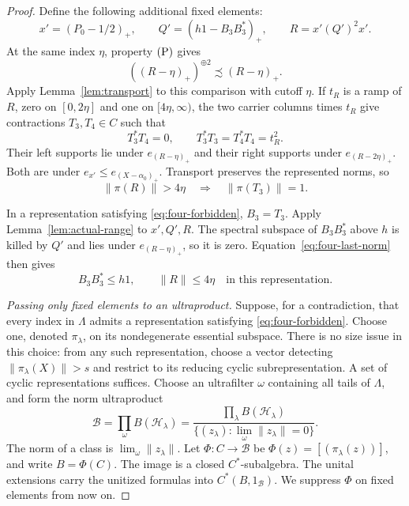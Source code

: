 \begin{proof}
Define the following additional fixed elements:
\begin{equation}\label{eq:four-second-fixed}
 x'=(P_0-1/2)_+,\qquad
 Q'=(h1-B_3B_3^*)_+,\qquad R=x'(Q')^2x'.
\end{equation}
At the same index \(\eta\), property \(\textup{(P)}\) gives
\[
 ((R-\eta)_+)^{\oplus2}\precsim(R-\eta)_+.
\]
Apply Lemma~\ref{lem:transport} to this comparison with cutoff
\(\eta\).  If \(t_R\) is a ramp of \(R\),
zero on \([0,2\eta]\) and one on \([4\eta,\infty)\), the two
carrier columns times \(t_R\) give contractions \(T_3,T_4\in C\)
such that
\begin{equation}\label{eq:four-last-entries}
 T_3^*T_4=0,\qquad T_3^*T_3=T_4^*T_4=t_R^2.
\end{equation}
Their left supports lie under \(e_{(R-\eta)_+}\) and their
right supports under \(e_{(R-2\eta)_+}\).  Both are under
\(e_{x'}\le e_{(X-\alpha_0)_+}\).  Transport preserves the
represented norms, so
\begin{equation}\label{eq:four-last-norm}
 \|\pi(R)\|>4\eta\quad\Longrightarrow\quad
 \|\pi(T_3)\|=1.
\end{equation}

In a representation satisfying \eqref{eq:four-forbidden},
\(B_3=T_3\).  Apply Lemma~\ref{lem:actual-range} to \(x',Q',R\).
The spectral subspace of \(B_3B_3^*\) above \(h\) is killed by
\(Q'\) and lies under \(e_{(R-\eta)_+}\), so it is zero.
Equation~\eqref{eq:four-last-norm} then gives
\begin{equation}\label{eq:four-last-bounds}
 B_3B_3^*\le h1,\qquad \|R\|\le4\eta
 \quad\text{in this representation}.
\end{equation}

\medskip\noindent\emph{Passing only fixed elements to an ultraproduct.}
Suppose, for a contradiction, that every index in \(\Lambda\)
admits a representation satisfying \eqref{eq:four-forbidden}.
Choose one, denoted \(\pi_\lambda\), on its nondegenerate
essential subspace.  There is no size issue in this choice: from
any such representation, choose a vector detecting
\(\|\pi_\lambda(X)\|>s\) and restrict to its reducing cyclic
subrepresentation.  A set of cyclic representations suffices.
Choose an ultrafilter \(\omega\) containing all tails of
\(\Lambda\), and form the norm ultraproduct
\[
 \mathcal B=\prod_{\omega}B(\mathcal H_\lambda)
 =\frac{\prod_\lambda B(\mathcal H_\lambda)}
 {\{(z_\lambda):\lim_{\omega}\|z_\lambda\|=0\}}.
\]
The norm of a class is \(\lim_{\omega}\|z_\lambda\|\).
Let \(\Phi:C\to\mathcal B\) be
\(\Phi(z)=[(\pi_\lambda(z))]\), and write \(B=\Phi(C)\).
The image is a closed \(C^*\)-subalgebra.  The unital extensions
carry the unitized formulas into \(C^*(B,1_{\mathcal B})\).
We suppress \(\Phi\) on fixed elements from now on.


\end{proof}
